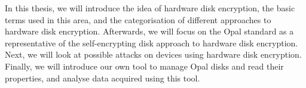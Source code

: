 In this thesis, we will introduce the idea of hardware disk encryption, the basic terms used in this area, and the categorisation of different approaches to hardware disk encryption. Afterwards, we will focus on the Opal standard as a representative of the self-encrypting disk approach to hardware disk encryption. Next, we will look at possible attacks on devices using hardware disk encryption. Finally, we will introduce our own tool to manage Opal disks and read their properties, and analyse data acquired using this tool.

\label{TODO}